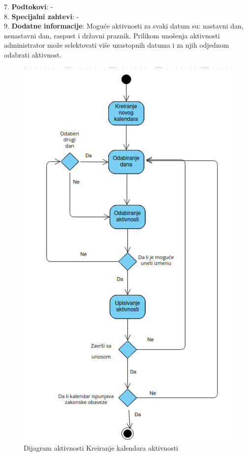 \documentclass{article}
\begin{document}
7. \textbf{Podtokovi}:  - \\

8. \textbf{Specijalni zahtevi}: - \\

9. \textbf{Dodatne informacije}: Moguće aktivnosti za svaki datum su: nastavni dan, nenastavni dan, raspust i državni praznik. Prilikom unošenja aktivnosti administrator može selektovati više uzastopnih datuma i za njih odjednom odabrati aktivnost. \\

\begin{figure} [!ht]
    \begin{center}
        \includegraphics[scale=0.35]{imgs/Dijagram_aktivnosti_administrator_kreira_kalendar.png}
    \end{center}
\caption{Dijagram aktivnosti Kreiranje kalendara aktivnosti}
\end{figure}
\end{document}

